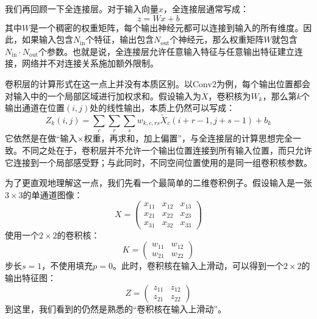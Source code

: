 我们再回顾一下全连接层。对于输入向量$x$，全连接层通常写成：
$$
z=Wx+b
$$
其中$W$是一个稠密的权重矩阵，每个输出神经元都可以连接到输入的所有维度。因此，如果输入包含$N_{\mathrm{in}}$个特征，输出包含$N_{\mathrm{out}}$个神经元，那么权重矩阵$W$就包含$N_{\mathrm{in}} \cdot N_{\mathrm{out}}$个参数。也就是说，全连接层允许任意输入特征与任意输出特征建立连接，网络并不对连接关系施加额外限制。

卷积层的计算形式在这一点上并没有本质区别。以Conv2为例，每个输出位置都会对输入中的一个局部区域进行加权求和。假设输入为$X$，卷积核为$W_k$，那么第$k$个输出通道在位置$(i,j)$处的线性输出，本质上仍然可以写成：
$$
Z_k(i,j)=\sum_c\sum_r\sum_s w_{k,c,rs}\tilde X_c(i+r-1,j+s-1)+b_k
$$
它依然是在做“输入$\times$权重，再求和，加上偏置”，与全连接层的计算思想完全一致。不同之处在于，卷积层并不允许一个输出位置连接到所有输入位置，而只允许它连接到一个局部感受野；与此同时，不同空间位置使用的是同一组卷积核参数。

为了更直观地理解这一点，我们先看一个最简单的二维卷积例子。假设输入是一张$3\times3$的单通道图像：
$$
X=\begin{pmatrix}
x_{11}&x_{12}&x_{13}\\
x_{21}&x_{22}&x_{23}\\
x_{31}&x_{32}&x_{33}
\end{pmatrix}
$$
使用一个$2\times2$的卷积核：
$$
K=\begin{pmatrix}
w_{11}&w_{12}\\
w_{21}&w_{22}
\end{pmatrix}
$$
步长$s=1$，不使用填充$p=0$。此时，卷积核在输入上滑动，可以得到一个$2\times2$的输出特征图：
$$
Z=\begin{pmatrix}
z_{11}&z_{12}\\
z_{21}&z_{22}
\end{pmatrix}
$$
到这里，我们看到的仍然是熟悉的“卷积核在输入上滑动”。


